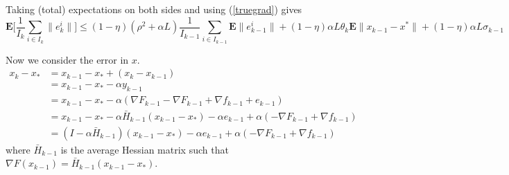 \documentclass{article}
\begin{document}
 Taking (total) expectations on both sides  and using (\ref{truegrad}) gives
 \[
\mathbf{E}[ \frac{1}{I_k} \sum_{i\in I_k}{\|e_k^i\|] } \leq (1-\eta)(\rho^2+\alpha  L) \frac{1}{I_{k-1}}\sum_{i\in I_{k-1}}\mathbf{E}\|e_{k-1}^i\| + (1-\eta) \alpha  L \theta_k \mathbf{E}\|  x_{k-1}  -x^*  \|  + (1-\eta) \alpha  L\sigma_{k-1}
 \]
 
 

\bigskip

\bigskip

\noindent 

Now we consider the error in $x$.
 \begin{align*}
  x_k-x_\ast &= x_{k-1}-x_\ast + (x_k-x_{k-1})\\
  &=x_{k-1}-x_\ast -\alpha y_{k-1}\\
  &=x_{k-1}-x_\ast -\alpha (\nabla F_{k-1}-\nabla F_{k-1}+\nabla f_{k-1} + e_{k-1})\\
  &=x_{k-1}-x_\ast -\alpha\bar H_{k-1}(x_{k-1}-x_\ast) -\alpha e_{k-1} +\alpha (-\nabla F_{k-1}+\nabla f_{k-1})\\
  &=(I-\alpha\bar H_{k-1})(x_{k-1}-x_\ast) -\alpha e_{k-1} +\alpha (-\nabla F_{k-1}+\nabla f_{k-1}) 
 \end{align*}
 where $\bar{H}_{k-1}$ is the average Hessian matrix such that  $\nabla F(x_{k-1}) = \bar H_{k-1}(x_{k-1}-x_\ast)$.
 
\end{document}
